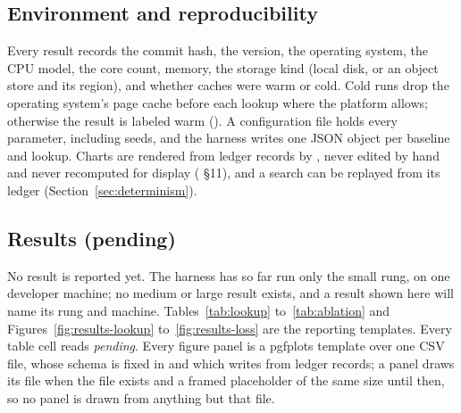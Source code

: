 \subsection{Environment and reproducibility}\label{sec:env}

Every result records the commit hash, the  version, the operating
system, the CPU model, the core count, memory, the storage kind (local disk, or
an object store and its region), and whether caches were warm or cold. Cold runs
drop the operating system's page cache before each lookup where the platform
allows; otherwise the result is labeled warm (). A
configuration file holds every parameter, including seeds, and the harness
writes one JSON object per baseline and lookup. Charts are rendered from ledger
records by , never edited by hand and never recomputed
for display ( \S11), and a search can be replayed from its ledger
(Section~\ref{sec:determinism}).

\subsection{Results (pending)}\label{sec:results}

No result is reported yet. The harness has so far run only the small rung, on
one developer machine; no medium or large result exists, and a result shown
here will name its rung and machine. Tables~\ref{tab:lookup}
to~\ref{tab:ablation} and
Figures~\ref{fig:results-lookup} to~\ref{fig:results-loss} are the reporting
templates. Every table cell reads \emph{pending}. Every figure panel is a
pgfplots template over one CSV file, whose schema is fixed in
 and which 
writes from ledger records; a panel draws its file when the file exists and a
framed placeholder of the same size until then, so no panel is drawn from
anything but that file.

